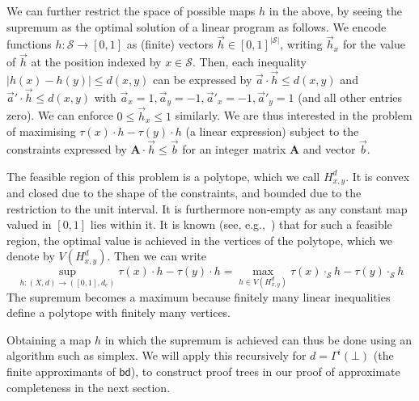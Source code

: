 \documentclass[a4paper,UKenglish,cleveref,autoref,thm-restate]{lipics-v2021}
\newcommand{\bd}{\mathsf{bd}}
\newcommand{\supps}{\mathcal{S}}
\newcommand{\Hpoly}{H_{x,y}^d}
\begin{document}
\begin{remark}\label{rem:hfromLP}
	We can further restrict the space of possible maps \(h\) in the above, by seeing the supremum as the optimal solution of a linear program as follows.
	We encode functions \(h \colon \supps \to [0,1]\) as (finite) vectors \(\vec{h} \in [0,1]^{|\supps|}\), writing \(\vec{h}_x\) for the value of \(\vec{h}\) at the position indexed by \(x \in \supps\).
	Then, each inequality \(|h(x) - h(y)| \leq d(x,y)\) can be expressed by \(\vec{a} \cdot \vec{h} \leq d(x,y)\) and \(\vec{a}' \cdot \vec{h} \leq d(x,y)\) with \(\vec{a}_x = 1, \vec{a}_y = -1, \vec{a}'_x = -1, \vec{a}'_y = 1\) (and all other entries zero). We can enforce \(0 \leq \vec{h}_x \leq 1\) similarly.
	We are thus interested in the problem of maximising \(\tau(x) \cdot h - \tau(y) \cdot h\) (a linear expression) subject to the constraints expressed by \(\mathbf{A} \cdot \vec{h} \leq \vec{b}\) for an integer matrix \(\mathbf{A}\) and vector \(\vec{b}\).

	The feasible region of this problem is a polytope, which we call \(\Hpoly\). It is convex and closed due to the shape of the constraints, and bounded due to the restriction to the unit interval. It is furthermore non-empty as any constant map valued in \([0,1]\) lies within it.
	It is known (see, e.g.,~\cite{trustrum1971linear}) that for such a feasible region, the optimal value is achieved in the vertices of the polytope, which we denote by \(V(\Hpoly)\). Then we can write
	\begin{equation*}
		\sup_{h \colon (X,d) \to ([0,1],d_e)} \tau(x) \cdot h - \tau(y) \cdot h = \max_{h \in V(\Hpoly)} \tau(x) \cdot_\supps h - \tau(y) \cdot_\supps h
	\end{equation*}
	The supremum becomes a maximum because finitely many linear inequalities define a polytope with finitely many vertices.

	Obtaining a map \(h\) in which the supremum is achieved can thus be done using an algorithm such as simplex. We will apply this recursively for \(d = \Gamma^i(\bot)\) (the finite approximants of \(\bd\)), to construct proof trees in our proof of approximate completeness in the next section.
\end{remark}
\end{document}
